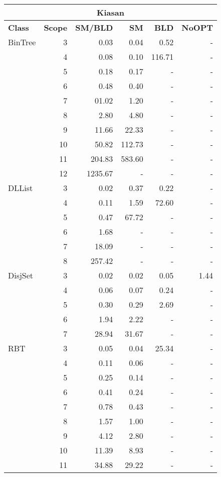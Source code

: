 \begin{table}[H]
\scriptsize
\centering
\label{tab:results-obj1}
\begin{tabular}{ l r | r | r | r | r  }
  \toprule
  \multicolumn{6}{c}{\textbf{Kiasan}} \\
  \midrule 
  \textbf{Class} & \textbf{Scope} & \textbf{SM/BLD} & \textbf{SM}  & \textbf{BLD} & \textbf{NoOPT}  \\
  \midrule
  BinTree
&	3	&	0.03	&	0.04	&	0.52	&	-	\\
&	4	&	0.08	&	0.10	&	116.71	&	-	\\
&	5	&	0.18	&	0.17	&	-	&	-	\\
&	6	&	0.48	&	0.40	&	-	&	-	\\
&	7	&	01.02	&	1.20	&	-	&	-	\\
&	8	&	2.80	&	4.80	&	-	&	-	\\
&	9	&	11.66	&	22.33	&	-	&	-	\\
&	10	&	50.82	&	112.73	&	-	&	-	\\
&	11	&	204.83	&	583.60	&	-	&	-	\\
&	12	&	1235.67	&	-	&	-	&	-	\\
  \midrule
  DLList
&	3	&	0.02	&	0.37	&	0.22	&	-	\\
&	4	&	0.11	&	1.59	&	72.60	&	-	\\
&	5	&	0.47	&	67.72	&	-	&	-	\\
&	6	&	1.68	&	-	&	-	&	-	\\
&	7	&	18.09	&	-	&	-	&	-	\\
&	8	&	257.42	&	-	&	-	&	-	\\
  \midrule
  DisjSet
&	3	&	0.02	&	0.02	&	0.05	&	1.44	\\
&	4	&	0.06	&	0.07	&	0.24	&	-	\\
&	5	&	0.30	&	0.29	&	2.69	&	-	\\
&	6	&	1.94	&	2.22	&	-	&	-	\\
&	7	&	28.94	&	31.67	&	-	&	-	\\
  \midrule
  RBT
&	3	&	0.05	&	0.04	&	25.34	&	-	\\
&	4	&	0.11	&	0.06	&	-	&	-	\\
&	5	&	0.25	&	0.14	&	-	&	-	\\
&	6	&	0.41	&	0.24	&	-	&	-	\\
&	7	&	0.78	&	0.43	&	-	&	-	\\
&	8	&	1.57	&	1.00	&	-	&	-	\\
&	9	&	4.12	&	2.80	&	-	&	-	\\
&	10	&	11.39	&	8.93	&	-	&	-	\\
&	11	&	34.88	&	29.22	&	-	&	-	\\

\end{tabular}
\end{table}

